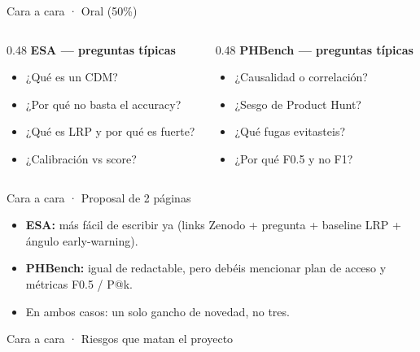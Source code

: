 \documentclass[aspectratio=169,10pt]{beamer}
\begin{document}
\begin{frame}{Cara a cara · Oral (50\%)}
  \begin{columns}[T]
    \begin{column}{0.48\textwidth}
      \textbf{ESA --- preguntas típicas}
      \begin{itemize}
        \item ¿Qué es un CDM?
        \item ¿Por qué no basta el accuracy?
        \item ¿Qué es LRP y por qué es fuerte?
        \item ¿Calibración vs score?
      \end{itemize}
    \end{column}
    \begin{column}{0.48\textwidth}
      \textbf{PHBench --- preguntas típicas}
      \begin{itemize}
        \item ¿Causalidad o correlación?
        \item ¿Sesgo de Product Hunt?
        \item ¿Qué fugas evitasteis?
        \item ¿Por qué F0.5 y no F1?
      \end{itemize}
    \end{column}
  \end{columns}
\end{frame}

\begin{frame}{Cara a cara · Proposal de 2 páginas}
  \begin{itemize}
    \item \textbf{ESA:} más fácil de escribir ya (links Zenodo + pregunta + baseline LRP + ángulo early-warning).
    \item \textbf{PHBench:} igual de redactable, pero debéis mencionar plan de acceso y métricas F0.5 / P@k.
    \item En ambos casos: un solo gancho de novedad, no tres.
  \end{itemize}
\end{frame}

\begin{frame}{Cara a cara · Riesgos que matan el proyecto}
\end{frame}
\end{document}
